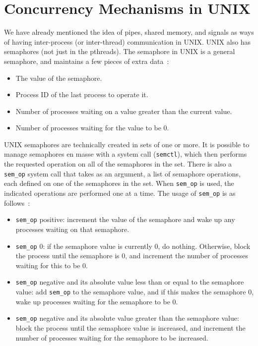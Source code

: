 \section*{Concurrency Mechanisms in UNIX}

We have already mentioned the idea of pipes, shared memory, and signals as ways of having inter-process (or inter-thread) communication in UNIX. UNIX also has semaphores (not just in the pthreads). The semaphore in UNIX is a general semaphore, and maintains a few pieces of extra data~\cite{osi}:
\begin{itemize}
    \item The value of the semaphore.
    \item Process ID of the last process to operate it.
    \item Number of processes waiting on a value greater than the current value.
    \item Number of processes waiting for the value to be 0.
\end{itemize}

UNIX semaphores are technically created in sets of one or more. It is possible to manage semaphores en masse with a system call (\texttt{semctl}), which then performs the requested operation on all of the semaphores in the set. There is also a \texttt{sem\_op} system call that takes as an argument, a list of semaphore operations, each defined on one of the semaphores in the set. When \texttt{sem\_op} is used, the indicated operations are performed one at a time. The usage of \texttt{sem\_op} is as follows~\cite{osi}:
\begin{itemize}
    \item \texttt{sem\_op} positive: increment the value of the semaphore and wake up any processes waiting on that semaphore.
    \item \texttt{sem\_op} 0: if the semaphore value is currently 0, do nothing. Otherwise, block the process until the semaphore is 0, and increment the number of processes waiting for this to be 0.
    \item \texttt{sem\_op} negative and its absolute value less than or equal to the semaphore value: add \texttt{sem\_op} to the semaphore value, and if this makes the semaphore 0, wake up processes waiting for the semaphore to be 0.
    \item \texttt{sem\_op} negative and its absolute value greater than the semaphore value: block the process until the semaphore value is increased, and increment the number of processes waiting for the semaphore to be increased.
\end{itemize}

